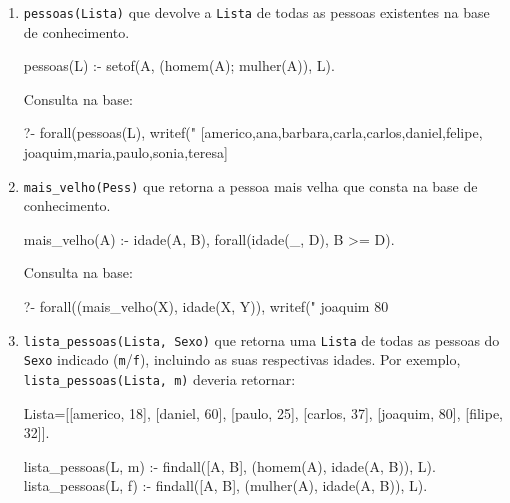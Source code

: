 \documentclass[10pt, twoside]{article}          %
\newenvironment{proof*}[1][proof*]              %
  {\proof[#1]\vspace{0.5em}\vspace*{-\baselineskip}
  \hspace{\parindent}\leftskip=.5cm\rightskip=.5cm}
  {\vspace*{-1.5\baselineskip}
  
  \rightskip=0cm\endproof}
\begin{document}
\begin{multicols*}{2}
\begin{enumerate}
\begin{proof*}[\unskip\nopunct]
\begin{enumerate}
      \item \texttt{pessoas(Lista)} que devolve a \texttt{Lista} de todas as pessoas existentes na 
      base de conhecimento.

        \begin{pseudocode}[gobble=10]
          pessoas(L) :-
              setof(A, (homem(A); mulher(A)), L).
        \end{pseudocode}

        Consulta na base:
        \begin{pseudocode}[gobble=10]
          ?- forall(pessoas(L), writef("%
          [americo,ana,barbara,carla,carlos,daniel,felipe,
           joaquim,maria,paulo,sonia,teresa]
        \end{pseudocode}

      \item \texttt{mais\_velho(Pess)} que retorna a pessoa mais velha que consta na base de 
      conhecimento.

        \begin{pseudocode}[gobble=10]
          mais_velho(A) :-
              idade(A, B),
              forall(idade(_, D), B >= D).
        \end{pseudocode}

        Consulta na base:
        \begin{pseudocode}[gobble=10]
          ?- forall((mais_velho(X), idade(X, Y)), 
                    writef("%
          joaquim 80
        \end{pseudocode}

      \item \texttt{lista\_pessoas(Lista, Sexo)} que retorna uma \texttt{Lista} de todas as pessoas 
      do \texttt{Sexo} indicado (\texttt{m}/\texttt{f}), incluindo as suas respectivas idades. Por 
      exemplo, \texttt{lista\_pessoas(Lista, m)} deveria retornar:
      \begin{pseudocode}[gobble=8]
        Lista=[[americo, 18], [daniel, 60], [paulo, 25], 
               [carlos, 37], [joaquim, 80], [filipe, 32]].
      \end{pseudocode} 

        \begin{pseudocode}[gobble=10]
          lista_pessoas(L, m) :-
              findall([A, B], (homem(A), idade(A, B)), L).
          lista_pessoas(L, f) :-
              findall([A, B], (mulher(A), idade(A, B)), L).
        \end{pseudocode}


\end{enumerate}
\end{proof*}
\end{enumerate}
\end{multicols*}
\end{document}
